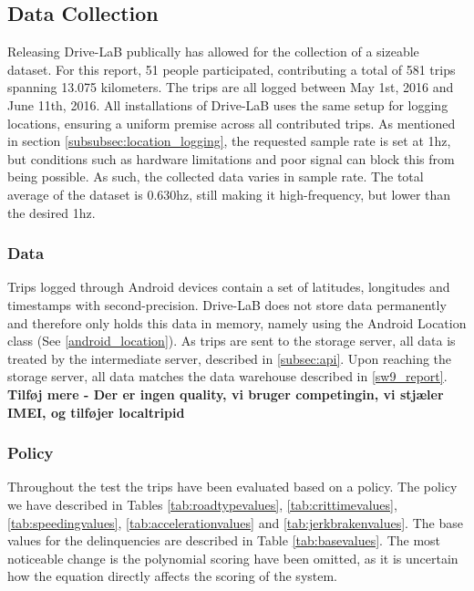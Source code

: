 \subsection{Data Collection}\label{sec:datacollection}
Releasing Drive-LaB publically has allowed for the collection of a sizeable dataset. For this report, 51 people participated, contributing a total of 581 trips spanning 13.075 kilometers. The trips are all logged between May 1st, 2016 and June 11th, 2016. All installations of Drive-LaB uses the same setup for logging locations, ensuring a uniform premise across all contributed trips. As mentioned in section \ref{subsubsec:location_logging}, the requested sample rate is set at 1hz, but conditions such as hardware limitations and poor signal can block this from being possible. As such, the collected data varies in sample rate. The total average of the dataset is 0.630hz, still making it high-frequency, but lower than the desired 1hz.

\subsubsection{Data}\label{subsec:data}
Trips logged through Android devices contain a set of latitudes, longitudes and timestamps with second-precision. Drive-LaB does not store data permanently and therefore only holds this data in memory, namely using the Android Location class (See \ref{android_location}). As trips are sent to the storage server, all data is treated by the intermediate server, described in \ref{subsec:api}. Upon reaching the storage server, all data matches the data warehouse described in \ref{sw9_report}. \textbf{Tilføj mere - Der er ingen quality, vi bruger competingin, vi stjæler IMEI, og tilføjer localtripid} 

\subsubsection{Policy}\label{subsec:policy}
Throughout the test the trips have been evaluated based on a policy. The policy we have described in Tables \ref{tab:roadtypevalues}, \ref{tab:crittimevalues}, \ref{tab:speedingvalues}, \ref{tab:accelerationvalues} and \ref{tab:jerkbrakenvalues}. The base values for the delinquencies are described in Table \ref{tab:basevalues}. The most noticeable change is the polynomial scoring have been omitted, as it is uncertain how the equation directly affects the scoring of the system.

